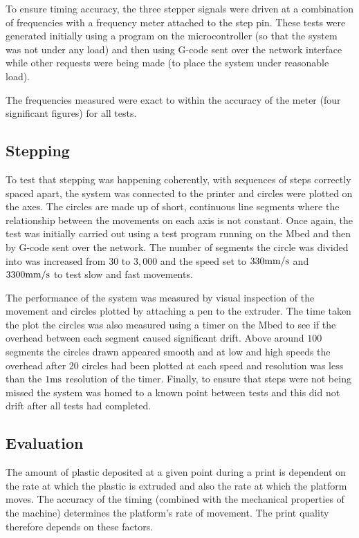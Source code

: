 			To ensure timing accuracy, the three stepper signals were driven at a
			combination of frequencies with a frequency meter attached to the step
			pin. These tests were generated initially using a program on the
			microcontroller (so that the system was not under any load) and then using
			G-code sent over the network interface while other requests were being
			made (to place the system under reasonable load).
			
			The frequencies measured were exact to within the accuracy of the meter
			(four significant figures) for all tests.
			
			
		
		\subsection{Stepping}
			
			To test that stepping was happening coherently, with sequences of steps
			correctly spaced apart, the system was connected to the printer and
			circles were plotted on the axes. The circles are made up of short,
			continuous line segments where the relationship between the movements on
			each axis is not constant. Once again, the test was initially carried out
			using a test program running on the Mbed and then by G-code sent over the
			network. The number of segments the circle was divided into was increased
			from $30$ to $3,000$ and the speed set to $330\textrm{mm}/\textrm{s}$ and $3300\textrm{mm}/\textrm{s}$ to
			test slow and fast movements.
			
			The performance of the system was measured by visual inspection of the
			movement and circles plotted by attaching a pen to the extruder. The time
			taken the plot the circles was also measured using a timer on the Mbed to
			see if the overhead between each segment caused significant drift. Above
			around $100$ segments the circles drawn appeared smooth and at low and
			high speeds the overhead after 20 circles had been plotted at each speed
			and resolution was less than the $1\textrm{ms}$ resolution of the timer. Finally,
			to ensure that steps were not being missed the system was homed to a known
			point between tests and this did not drift after all tests had completed.
			
		\subsection{Evaluation}
		
			The amount of plastic deposited at a given point during a print is
			dependent on the rate at which the plastic is extruded and also the rate
			at which the platform moves. The accuracy of the timing (combined with the
			mechanical properties of the machine) determines the platform's rate of
			movement. The print quality therefore depends on these factors.
			
